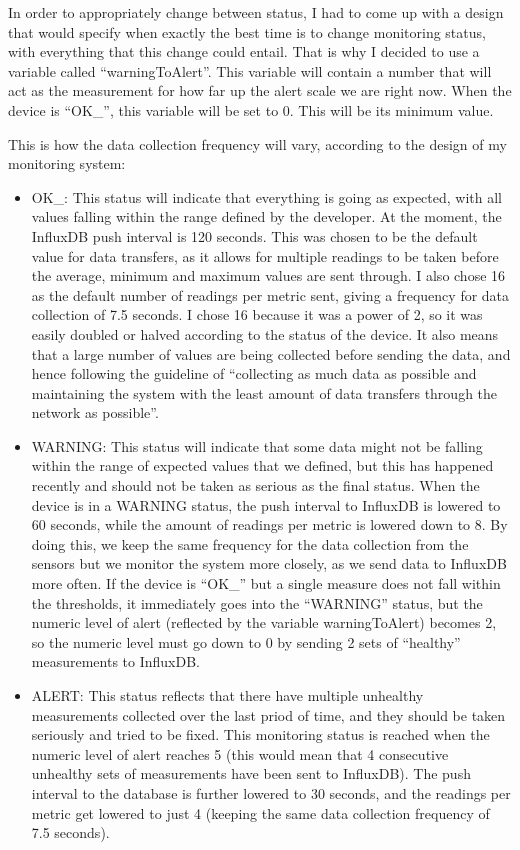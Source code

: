 \documentclass[12pt]{article}
\begin{document}
In order to appropriately change between status, I had to come up with a design that would specify when exactly the best time is to change monitoring status, with everything that this change could entail. That is why I decided to use a variable called ``warningToAlert''. This variable will contain a number that will act as the measurement for how far up the alert scale we are right now. When the device is ``OK\_'', this variable will be set to 0. This will be its minimum value. \par

This is how the data collection frequency will vary, according to the design of my monitoring system: 
\begin{itemize}
    \item OK\_: This status will indicate that everything is going as expected, with all values falling within the range defined by the developer. At the moment, the InfluxDB push interval is 120 seconds. This was chosen to be the default value for data transfers, as it allows for multiple readings to be taken before the average, minimum and maximum values are sent through. I also chose 16 as the default number of readings per metric sent, giving a frequency for data collection of 7.5 seconds. I chose 16 because it was a power of 2, so it was easily doubled or halved according to the status of the device. It also means that a large number of values are being collected before sending the data, and hence following the guideline of ``collecting as much data as possible and maintaining the system with the least amount of data transfers through the network as possible''.
    \item WARNING: This status will indicate that some data might not be falling within the range of expected values that we defined, but this has happened recently and should not be taken as serious as the final status. When the device is in a WARNING status, the push interval to InfluxDB is lowered to 60 seconds, while the amount of readings per metric is lowered down to 8. By doing this, we keep the same frequency for the data collection from the sensors but we monitor the system more closely, as we send data to InfluxDB more often. If the device is ``OK\_'' but a single measure does not fall within the thresholds, it immediately goes into the ``WARNING'' status, but the numeric level of alert (reflected by the variable warningToAlert) becomes 2, so the numeric level must go down to 0 by sending 2 sets of ``healthy'' measurements to InfluxDB.
    \item ALERT: This status reflects that there have multiple unhealthy measurements collected over the last priod of time, and they should be taken seriously and tried to be fixed. This monitoring status is reached when the numeric level of alert reaches 5 (this would mean that 4 consecutive unhealthy sets of measurements have been sent to InfluxDB). The push interval to the database is further lowered to 30 seconds, and the readings per metric get lowered to just 4 (keeping the same data collection frequency of 7.5 seconds). 
\end{itemize}
\end{document}
